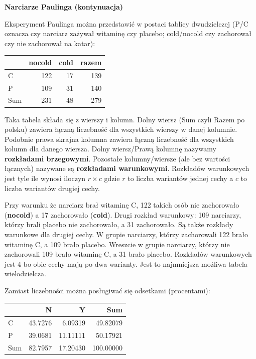 \documentclass[
  openany]{book}
\begin{document}
\begin{example}
\textbf{Narciarze Paulinga (kontynuacja)}

Eksperyment Paulinga można przedstawić w postaci tablicy dwudzielczej
(P/C oznacza czy narciarz zażywał witaminę czy placebo; cold/nocold
czy zachorował czy nie zachorował na katar):

\begin{tabular}{l|r|r|r}
\hline
  & nocold & cold & razem\\
\hline
C & 122 & 17 & 139\\
\hline
P & 109 & 31 & 140\\
\hline
Sum & 231 & 48 & 279\\
\hline
\end{tabular}

Taka tabela składa się z wierszy i kolumn. Dolny wiersz (Sum czyli Razem
po polsku) zawiera łączną liczebność dla wszystkich wierszy w danej kolumnie. Podobnie prawa skrajna kolumna zawiera łączną
liczebność dla wszystkich kolumn dla danego wiersza. Dolny wiersz/Prawą
kolumnę nazywamy \textbf{rozkładami brzegowymi}.
Pozostałe kolumny/wiersze (ale bez wartości łącznych) nazywane
są \textbf{rozkładami warunkowymi}. Rozkładów warunkowych jest tyle ile
wynosi iloczyn \(r \times c\) gdzie \(r\) to liczba wariantów jednej cechy
a \(c\) to liczba wariantów drugiej cechy.

Przy warunku że narciarz brał witaminę C, 122 takich osób
nie zachorowało (\textbf{nocold}) a 17 zachorowało (\textbf{cold}).
Drugi rozkład warunkowy: 109 narciarzy, którzy brali placebo
nie zachorowało, a 31 zachorowało. Są także rozkłady
warunkowe dla drugiej cechy. W grupie narciarzy, którzy zachorowali
122 brało witaminę C, a 109 brało placebo.
Wreszcie w grupie narciarzy, którzy nie zachorowali
109 brało witaminę C, a 31 brało placebo.
Rozkładów warunkowych jest 4 bo obie cechy mają po dwa warianty. Jest
to najmniejsza możliwa tabela wielodzielcza.

Zamiast liczebności można posługiwać się odsetkami (procentami):

\begin{tabular}{l|r|r|r}
\hline
  & N & Y & Sum\\
\hline
C & 43.7276 & 6.09319 & 49.82079\\
\hline
P & 39.0681 & 11.11111 & 50.17921\\
\hline
Sum & 82.7957 & 17.20430 & 100.00000\\
\hline
\end{tabular}


\end{example}
\end{document}
